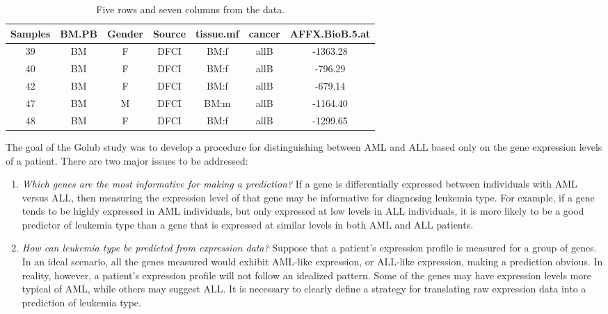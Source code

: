 
\begin{table}[ht]
	\centering
	\begin{tabular}{ccccccc}
		\hline
		Samples & BM.PB & Gender & Source & tissue.mf & cancer & AFFX.BioB.5.at \\ 
		\hline
		  39 & BM & F & DFCI & BM:f & allB & -1363.28 \\ 
		  40 & BM & F & DFCI & BM:f & allB & -796.29 \\ 
		  42 & BM & F & DFCI & BM:f & allB & -679.14 \\ 
		  47 & BM & M & DFCI & BM:m & allB & -1164.40 \\ 
		  48 & BM & F & DFCI & BM:f & allB & -1299.65 \\ 
		\hline
	\end{tabular}
	\caption{Five rows and seven columns from the  data.} 
	\label{sampleGolubData}
\end{table}

The goal of the Golub study was to develop a procedure for distinguishing between AML and ALL based only on the gene expression levels of a patient. There are two major issues to be addressed:

\begin{enumerate}
	\item \textit{Which genes are the most informative for making a prediction?} If a gene is differentially expressed between individuals with AML versus ALL, then measuring the expression level of that gene may be informative for diagnosing leukemia type. For example, if a gene tends to be highly expressed in AML individuals, but only expressed at low levels in ALL individuals, it is more likely to be a good predictor of leukemia type than a gene that is expressed at similar levels in both AML and ALL patients.  
	
	\item \textit{How can leukemia type be predicted from expression data?} Suppose that a patient's expression profile is measured for a group of genes. In an ideal scenario, all the genes measured would exhibit AML-like expression, or ALL-like expression, making a prediction obvious. In reality, however, a patient's expression profile will not follow an idealized pattern. Some of the genes may have expression levels more typical of AML, while others may suggest ALL. It is necessary to clearly define a strategy for translating raw expression data into a prediction of leukemia type.
	
\end{enumerate}

